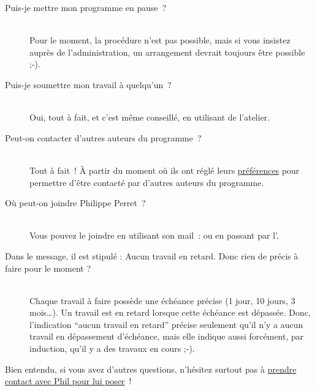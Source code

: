 \begin{description}
\item[Puis-je mettre mon programme en pause~{}?] \hfill \\
 Pour le moment, la procédure n'est pas possible, mais si vous insistez auprès de l'administration, un arrangement devrait toujours être possible ;-).



\item[Puis-je soumettre mon travail à quelqu'un~{}?] \hfill \\
 Oui, tout à fait, et c'est même conseillé, en utilisant \leForum{} de l'atelier.



\item[Peut-on contacter d'autres auteurs du programme~{}?] \hfill \\
 Tout à fait~{}! À partir du moment où ils ont réglé leurs \hyperlink{preferences-auteur}{préférences} pour permettre d'être contacté par d'autres auteurs du programme.



\item[Où peut-on joindre Philippe Perret~{}?] \hfill \\
 Vous pouvez le joindre en utilisant son mail~{}:  ou en passant par l'.



\item[Dans le message, il est stipulé : Aucun travail en retard. Donc rien de précis à faire pour le moment ?] \hfill \\
 Chaque travail à faire possède une échéance précise (1 jour, 10 jours, 3 mois…). Un travail est en retard lorsque cette échéance est dépassée. Donc, l'indication “aucun travail en retard” précise seulement qu'il n'y a aucun travail en dépassement d'échéance, mais elle indique aussi forcément, par induction, qu'il y a des travaux en cours ;-).
\end{description}

Bien entendu, si vous avez d'autres questions, n'hésitez surtout pas à \href{http://www.laboiteaoutilsdelauteur.fr/site/contact}{prendre contact avec Phil pour lui poser}~{}!

